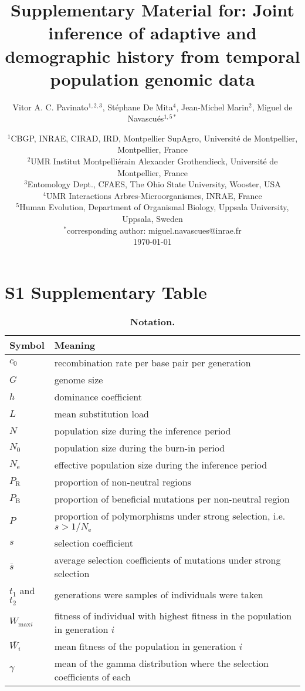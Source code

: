 \documentclass[a4paper, 12pt]{article}
\title{Supplementary Material for: Joint inference of adaptive and demographic history from temporal population genomic data}
\author{\small
            Vitor A. C. Pavinato$^{1,2,3}$, Stéphane De Mita$^4$, Jean-Michel Marin$^2$, Miguel de Navascués$^{1,5*}$}
\date{{\footnotesize %
    $^1$CBGP, INRAE, CIRAD, IRD, Montpellier SupAgro, Université de Montpellier, Montpellier, France\\%
    $^2$UMR Institut Montpelliérain Alexander Grothendieck, Université de Montpellier, France\\%
    $^3$Entomology Dept., CFAES, The Ohio State University, Wooster, USA\\%
    $^4$UMR Interactions Arbres-Microorganismes, INRAE, France \\%
    $^5$Human Evolution, Department of Organismal Biology, Uppsala University, Uppsala, Sweden\\%
    $^*$corresponding author: miguel.navascues@inrae.fr\\[2ex]%
    }
    \footnotesize\today    
}
\begin{document}
\maketitle

\newpage

\section*{S1 Supplementary Table}

\begin{table}[ht]
 \caption{\textbf{Notation.}}
  \centering
  \label{table:tableS1}
  \begin{tabular}{ll}
   \cmidrule(r){1-2}
    Symbol                  & Meaning \\
    \midrule
    $c_{\mathrm{0}}$        & recombination rate per base pair per generation \\
    $G$                     & genome size\\
    $h$                     & dominance coefficient\\
    $L$                     & mean substitution load\\
    $N$                     & population size during the inference period\\ 
    $N_{\mathrm{0}}$        & population size during the burn-in period\\
    $N_{\mathrm{e}}$        & effective population size during the inference period\\
    $P_{\mathrm{R}}$        & proportion of non-neutral regions\\
    $P_{\mathrm{B}}$        & proportion of beneficial mutations per non-neutral region\\
    $P$                     & proportion of polymorphisms under strong selection, i.e. $s > 1/ N_{\mathrm{e}}$\\
    $s$                     & selection coefficient\\
    $\bar{s}$               & average selection coefficients of mutations under strong selection\\
    $t_1$ and $t_2$         & generations were samples of individuals were taken\\
    $W_{\mathrm{max}i}$     & fitness of individual with highest fitness in the population in generation $i$\\
    $\bar{W_{i}}$           & mean fitness of the population in generation $i$\\
    $\gamma$                & mean of the gamma distribution where the selection coefficients of each\\

\end{tabular}
\end{table}
\end{document}
